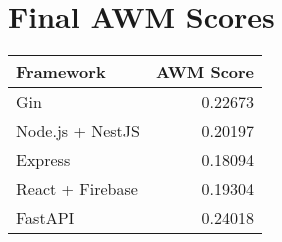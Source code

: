 \documentclass{article}
\begin{document}
\section*{Final AWM Scores}
\begin{longtable}{l r} \toprule Framework & AWM Score \\ \midrule
Gin & 0.22673 \\
Node.js + NestJS & 0.20197 \\
Express & 0.18094 \\
React + Firebase & 0.19304 \\
FastAPI & 0.24018 \\
\bottomrule \end{longtable}
\end{document}
